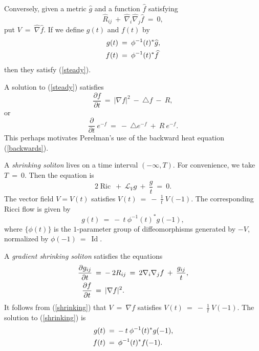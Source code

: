 \documentclass[12pt]{amsart}
\newcommand{\Id}{\operatorname{Id}}
\newcommand{\Ric}{\operatorname{Ric}}
\numberwithin{equation}{section}
\theoremstyle{plain}
\theoremstyle{definition}
\theoremstyle{remark}
\begin{document}
Conversely, given a metric $\widehat{g}$ and a function $\widehat{f}$
satisfying 
\begin{equation}
\widehat{R}_{ij} \: + \: \widehat{\nabla}_i \widehat{\nabla}_j \widehat{f}
\: = \: 0,
\end{equation}
put $V \: = \: \widehat{\nabla} \widehat{f}$. 
If we define $g(t)$ and $f(t)$ by 
\begin{align}
g(t) \: & = \: \phi^{-1}(t)^* \widehat{g}, \\
f(t) \: & = \: \phi^{-1}(t)^* \widehat{f} \notag
\end{align}
then they satisfy (\ref{steady}). 


A solution to (\ref{steady}) satisfies
\begin{equation}
\frac{\partial f}{\partial t} \: = \: |\nabla f|^2 \: - \: \triangle f
\: - \: R,
\end{equation}
or
\begin{equation}
\frac{\partial}{\partial t} \: e^{-f} \: = \: - \: \triangle e^{-f}
\: + \: R \: e^{-f}.
\end{equation}
This perhaps motivates Perelman's use of the backward heat
equation (\ref{backwards}).


A {\em shrinking soliton} lives on a time interval $(-\infty, T)$.
For convenience, we take $T \: = \: 0$. Then the equation is
\begin{equation}
2 \Ric \: + \: {\mathcal L}_V g \: + \: \frac{g}{t} \: = \: 0.
\end{equation}
The vector field $V = V(t)$ satisfies
$V(t) \: = \: - \: \frac{1}{t} \: V(-1)$.
The corresponding Ricci flow is given by
\begin{equation} \label{shrinkingflow}
g(t) \: = \: - \: t \: \phi^{-1}(t)^* g(-1),
\end{equation}
where $\{ \phi(t) \}$ is the $1$-parameter group of diffeomorphisms generated 
by $- V$, normalized by $\phi(-1) \: = \: \Id$. 


A {\em gradient shrinking soliton} satisfies the equations
\begin{align} \label{shrinking}
\frac{\partial g_{ij}}{\partial t} \: & = \: - \: 2 R_{ij} \: = \:
2 \nabla_i \nabla_j f \: + \: \frac{g_{ij}}{t}, \\
\frac{\partial f}{\partial t} \: & = \: |\nabla f|^2. \notag
\end{align}
It follows from (\ref{shrinking}) that
$V \: = \: \nabla f$ satisfies $V(t) \: = \: - \: \frac{1}{t} \: V(-1)$.
The solution to (\ref{shrinking}) is
\begin{align} \label{shrinkingsoln}
g(t) \: & = \: - \: t \: \phi^{-1}(t)^* g(-1), \\
f(t) \: & = \: \phi^{-1}(t)^* f(-1). \notag
\end{align}
\end{document}
